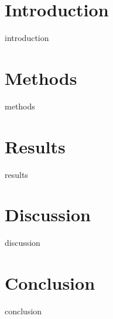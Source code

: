 \chapter{Introduction}
    {introduction}
\chapter{Methods}
    {methods}
\chapter{Results}
    {results}
\chapter{Discussion}
    {discussion}
\chapter{Conclusion}
    {conclusion}
